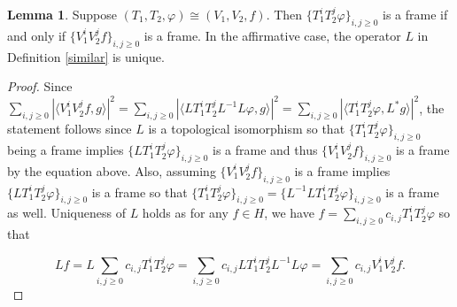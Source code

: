 \documentclass[12pt,reqno]{amsart}
\theoremstyle{definition}
\theoremstyle{definition}
\newtheorem{lemma}[theorem]{Lemma}
\numberwithin{equation}{section}
\begin{document}
\begin{lemma} \label{similarity}
Suppose $(T_1, T_2, \varphi) \cong (V_1, V_2, f)$. Then $\{T_{1}^iT_{2}^j\varphi\}_{i,j \geq 0}$ is a frame if and only if $\{V_{1}^iV_{2}^jf\}_{i,j \geq 0}$ is a frame. In the affirmative case,  the operator $L$ in Definition \ref{similar} is unique. 
\end{lemma}
\begin{proof}
Since $\underset{i,j \geq 0}{\sum} |\langle V_{1}^iV_{2}^jf, g \rangle |^2 = \underset{i,j \geq 0}{\sum} |\langle LT_{1}^iT_{2}^jL^{-1} L\varphi , g\rangle |^2 = \underset{i,j \geq 0}{\sum} |\langle T_{1}^iT_{2}^j\varphi, L^*g \rangle |^2$, the statement follows since $L$ is a topological isomorphism so that $\{T_{1}^iT_{2}^j\varphi\}_{i,j \geq 0}$ being a frame implies $\{LT_{1}^iT_{2}^j\varphi\}_{i,j \geq 0}$ is a frame and thus $\{V_{1}^iV_{2}^jf\}_{i,j \geq 0}$ is a frame by the equation above. Also, assuming $\{V_{1}^iV_{2}^jf\}_{i,j \geq 0}$ is a frame implies $\{LT_{1}^iT_{2}^j\varphi\}_{i,j \geq 0}$ is a frame so that $\{T_{1}^iT_{2}^j\varphi\}_{i,j \geq 0} = \{L^{-1}LT_{1}^iT_{2}^j\varphi\}_{i,j \geq 0}$ is a frame as well. Uniqueness of $L$ holds as for any $f \in H$, we have $f = \underset{i,j \geq 0}{\sum} c_{i,j} T_1^iT_2^j\varphi$ so that 

\begin{displaymath}  
Lf = L \underset{i,j \geq 0}{\sum} c_{i,j} T_1^iT_2^j\varphi = \underset{i,j \geq 0}{\sum} c_{i,j} LT_1^iT_2^jL^{-1} L\varphi
= \underset{i,j \geq 0}{\sum} c_{i,j} V_1^iV_2^jf.
\end{displaymath}

\end{proof}



\end{document}
